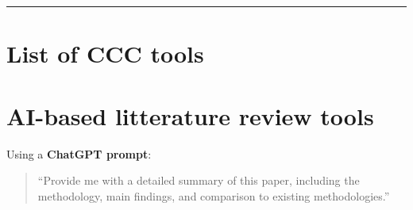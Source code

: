 \documentclass[
  letterpaper,
]{book}
\begin{document}
\begin{center}\rule{0.5\linewidth}{0.5pt}\end{center}

\section{List of CCC tools}\label{sec-ccc-tools}

\section*{AI-based litterature review
tools}\label{ai-based-litterature-review-tools}


Using a \textbf{ChatGPT prompt}:

\begin{quote}
``Provide me with a detailed summary of this paper, including the
methodology, main findings, and comparison to existing methodologies.''
\end{quote}


\backmatter
\end{document}

